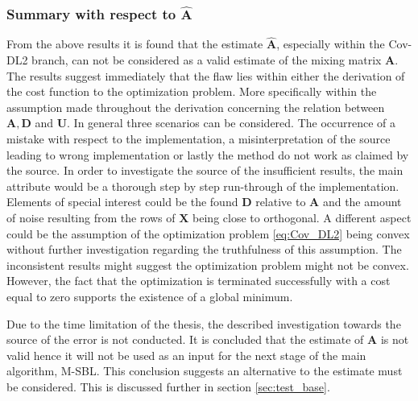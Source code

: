 \subsubsection{Summary with respect to $\hat{\mathbf{A}}$}
From the above results it is found that the estimate $\hat{\mathbf{A}}$, especially within the Cov-DL2 branch, can not be considered as a valid estimate of the mixing matrix $\mathbf{A}$. 
The results suggest immediately that the flaw lies within either the derivation of the cost function to the optimization problem. More specifically within the assumption made throughout the derivation concerning the relation between $\mathbf{A}, \mathbf{D}$ and $\mathbf{U}$. 
In general three scenarios can be considered. 
The occurrence of a mistake with respect to the implementation, a misinterpretation of the source \cite{Balkan2015} leading to wrong implementation or lastly the method do not work as claimed by the source. 
In order to investigate the source of the insufficient results, the main attribute would be a thorough step by step run-through of the implementation. 
Elements of special interest could be the found $\mathbf{D}$ relative to $\mathbf{A}$ and the amount of noise resulting from the rows of $\mathbf{X}$ being close to orthogonal. 
A different aspect could be the assumption of the optimization problem \eqref{eq:Cov_DL2} being convex without further investigation regarding the truthfulness of this assumption. 
The inconsistent results might suggest the optimization problem might not be convex. 
However, the fact that the optimization is terminated successfully with a cost equal to zero supports the existence of a global minimum.

Due to the time limitation of the thesis, the described investigation towards the source of the error is not conducted. 
It is concluded that the estimate of $\mathbf{A}$ is not valid hence it will not be used as an input for the next stage of the main algorithm, M-SBL. 
This conclusion suggests an alternative to the estimate must be considered. 
This is discussed further in section \ref{sec:test_base}.

